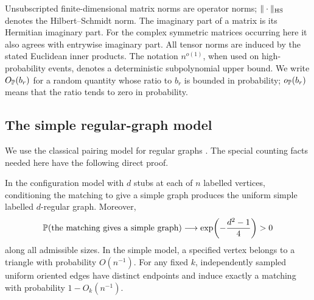 Unsubscripted finite-dimensional matrix norms are operator norms;
\(\|\cdot\|_{\mathrm{HS}}\) denotes the Hilbert--Schmidt norm.
The imaginary part of a matrix is its Hermitian imaginary part.
For the complex symmetric matrices occurring here it also agrees with
entrywise imaginary part.
All tensor norms are induced by the stated Euclidean inner products.
The notation \(n^{o(1)}\), when used on high-probability events, denotes a
deterministic subpolynomial upper bound.
We write \(O_{\mathbb P}(b_r)\) for a random quantity whose ratio to \(b_r\) is
bounded in probability; \(o_{\mathbb P}(b_r)\) means that the ratio tends
to zero in probability.

\subsection{The simple regular-graph model}

We use the classical pairing model for regular graphs
\cite{BollobasPairing}. The special counting facts needed here have
the following direct proof.

\begin{lemma}\label{lem:model}
In the configuration model with \(d\) stubs at each of \(n\) labelled
vertices, conditioning the matching to give a simple graph produces the
uniform simple labelled \(d\)-regular graph. Moreover,
\[
 \mathbb P(\text{the matching gives a simple graph})
       \longrightarrow \exp\!\left(-\frac{d^2-1}{4}\right)>0
\]
along all admissible sizes.
In the simple model, a specified vertex belongs to a triangle with
probability \(O(n^{-1})\).
For any fixed \(k\), independently sampled uniform oriented edges have
distinct endpoints and induce exactly a matching with probability
\(1-O_k(n^{-1})\).
\end{lemma}

